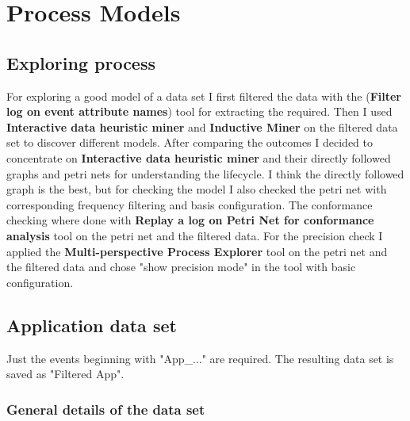 \section{Process Models}

\subsection{Exploring process}

For exploring a good model of a data set I first filtered the data with the (\textbf{Filter log on event attribute names}) tool for extracting the required. Then I used \textbf{Interactive data heuristic miner} and \textbf{Inductive Miner} on the filtered data set to discover different models. After comparing the outcomes I decided to concentrate on \textbf{Interactive data heuristic miner} and their directly followed graphs and petri nets for understanding the lifecycle. I think the directly followed graph is the best, but for checking the model I also checked the petri net with corresponding frequency filtering and basis configuration. The conformance checking where done with \textbf{Replay a log on Petri Net for conformance analysis} tool on the petri net and the filtered data. For the precision check I applied the \textbf{Multi-perspective Process Explorer} tool on the petri net and the filtered data and chose "show precision mode" in the tool with basic configuration.

\subsection{Application data set}
Just the events beginning with "App\_..." are required. The resulting data set is saved as "Filtered App".

\subsubsection{General details of the data set}


